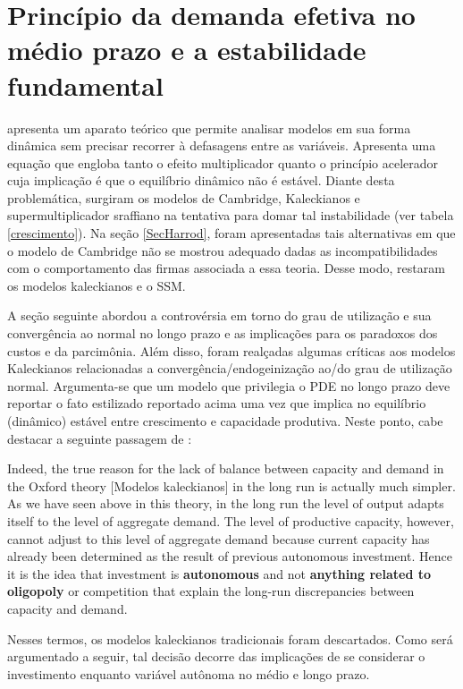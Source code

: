 \section{Princípio da demanda efetiva no médio prazo e a estabilidade fundamental} \label{Concl1}



\textcite{harrod_essay_1939} apresenta um aparato teórico que permite analisar modelos em sua forma dinâmica sem precisar recorrer à defasagens entre as variáveis. Apresenta uma equação que engloba tanto o efeito multiplicador quanto o princípio acelerador cuja implicação é que o equilíbrio dinâmico não é estável. Diante desta problemática, surgiram os modelos de Cambridge, Kaleckianos e supermultiplicador sraffiano na tentativa para domar tal instabilidade (ver tabela \ref{crescimento}). Na seção \ref{SecHarrod}, foram apresentadas tais alternativas em que o modelo de Cambridge não se mostrou adequado dadas as incompatibilidades com o comportamento das firmas associada a essa teoria. Desse modo, restaram os modelos kaleckianos e o SSM. 

A seção seguinte abordou a controvérsia em torno do grau de utilização e sua convergência ao normal no longo prazo e as implicações para os paradoxos dos custos e da parcimônia. Além disso, foram realçadas algumas críticas aos modelos Kaleckianos relacionadas a convergência/endogeinização ao/do grau de utilização normal. Argumenta-se que um modelo que privilegia o PDE no longo prazo deve reportar o fato estilizado reportado acima uma vez que implica no equilíbrio (dinâmico) estável entre crescimento e capacidade produtiva. Neste ponto, cabe destacar a seguinte passagem de \textcite[p.~120, grifos nossos]{serrano_sraffian_1995}:

\begin{citacao}
Indeed, the true reason for the lack of balance between capacity and demand in the Oxford theory [Modelos kaleckianos] in the long run is actually much simpler. As we have seen above in this theory, in the long run the level of output adapts itself to the level of aggregate demand. The level of productive capacity, however, cannot adjust to this level of aggregate demand because current capacity has already been determined as the result of previous autonomous investment. Hence it is the idea that investment is \textbf{autonomous} and not \textbf{anything related to oligopoly} or competition that explain the long-run discrepancies between capacity and demand.
\end{citacao}
Nesses termos, os modelos kaleckianos tradicionais foram descartados. Como será argumentado a seguir, tal decisão decorre das implicações de se considerar o investimento enquanto variável autônoma no médio  e longo prazo.

